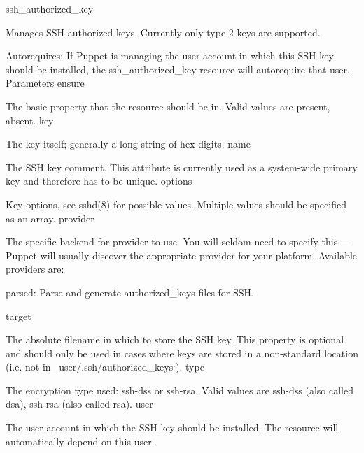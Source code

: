 ssh_authorized_key

Manages SSH authorized keys. Currently only type 2 keys are supported.

Autorequires: If Puppet is managing the user account in which this SSH key should be installed, the ssh_authorized_key resource will autorequire that user.
Parameters
ensure

The basic property that the resource should be in. Valid values are present, absent.
key

The key itself; generally a long string of hex digits.
name

The SSH key comment. This attribute is currently used as a system-wide primary key and therefore has to be unique.
options

Key options, see sshd(8) for possible values. Multiple values should be specified as an array.
provider

The specific backend for provider to use. You will seldom need to specify this — Puppet will usually discover the appropriate provider for your platform. Available providers are:

    parsed: Parse and generate authorized_keys files for SSH.

target

The absolute filename in which to store the SSH key. This property is optional and should only be used in cases where keys are stored in a non-standard location (i.e. not in ~user/.ssh/authorized_keys`).
type

The encryption type used: ssh-dss or ssh-rsa. Valid values are ssh-dss (also called dsa), ssh-rsa (also called rsa).
user

The user account in which the SSH key should be installed. The resource will automatically depend on this user.
